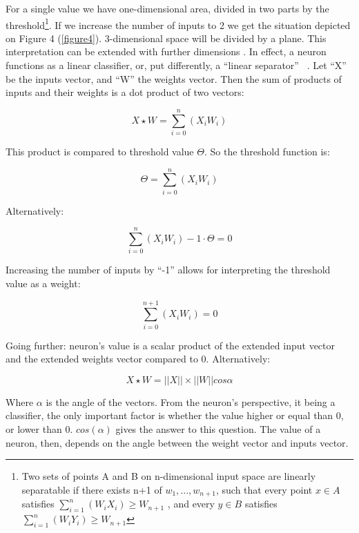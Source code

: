 \documentclass[10pt,oneside]{memoir}
\begin{document}
For a single value we have one-dimensional area, divided in two parts by the threshold\footnote{Two sets of points A and B on n-dimensional input space are linearly separatable if there exists n+1 of  $ {w}_{1},...,{w}_{n+1}$, such that every point $ x\in A$ satisfies $ \sum _{i=1}^{n}\left({W}_{i}{X}_{i}\right)\ge {W}_{n+1}$ , and every $ y\in B$ satisfies $ \sum _{i=1}^{n}\left({W}_{i}{Y}_{i}\right)\ge {W}_{n+1}$}. If we increase the number of inputs to 2 we get the situation depicted on Figure 4 (\autoref{figure4}). 3-dimensional space will be divided by a plane. This interpretation can be extended with further dimensions \cite{Camaro:1990}. In effect, a neuron functions as a linear classifier, or, put differently, a ``linear separator'' ~\cite{Podolak:2003:Perceptron}.
Let ``X'' be the inputs vector, and ``W'' the weights vector. Then the sum of products of inputs and their weights is a dot product of two vectors:


\begin{equation}
X\star W=\sum _{i=0}^{n}\left({X}_{i}{W}_{i}\right)
\end{equation}


This product is compared to threshold value $\Theta $. So the threshold function is:


\begin{equation}
\Theta =\sum _{i=0}^{n}\left({X}_{i}{W}_{i}\right)
\end{equation}


Alternatively:


\begin{equation}
\sum _{i=0}^{n}\left({X}_{i}{W}_{i}\right)-1\cdot \Theta =0
\end{equation}


Increasing the number of inputs by ``-1'' allows for interpreting the threshold value as a weight:


\begin{equation}
\sum _{i=0}^{n+1}\left({X}_{i}{W}_{i}\right)=0
\end{equation}


Going further: neuron's value is a scalar product of the extended input vector and the extended weights vector compared to 0. Alternatively:


\begin{equation}
X\star W=\left|\left|X\right|\right|\times \left|\left|W\right|\right|cos\alpha 
\end{equation}


Where $ \alpha $ is the angle of the vectors. From the neuron's perspective, it being a classifier, the only important factor is whether the value higher or equal than 0, or lower than 0. $ cos\left(\alpha \right)$ gives the answer to this question.
The value of a neuron, then, depends on the angle between the weight vector and inputs vector.
\end{document}
